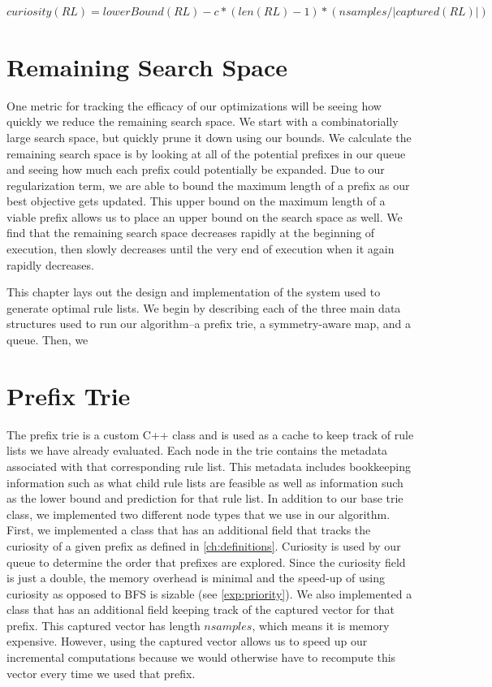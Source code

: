 \documentclass[]{report}
\theoremstyle{definition}
\begin{document}
\begin{math}
curiosity(RL) = lowerBound(RL) - c * (len(RL) - 1)  * (nsamples / |captured(RL)|)
\end{math}

\section{Remaining Search Space}
One metric for tracking the efficacy of our optimizations will be seeing how quickly we reduce the remaining search space.
We start with a combinatorially large search space, but quickly prune it down using our bounds.
We calculate the remaining search space is by looking at all of the potential prefixes in our  queue and seeing how much each prefix could potentially be expanded.
Due to our regularization term, we are able to bound the maximum length of a prefix as our best objective gets updated.
This upper bound on the maximum length of a viable prefix allows us to place an upper bound on the search space as well.
We find that the remaining search space decreases rapidly at the beginning of execution, then slowly decreases until the very end of execution when it again rapidly decreases.

This chapter lays out the design and implementation of the system used to generate optimal rule lists. 
We begin by describing each of the three main data structures used to run our algorithm--a prefix trie, a symmetry-aware map, and a queue. 
Then, we 

\section{Prefix Trie}
The prefix trie is a custom C++ class and is used as a cache to keep track of rule lists we have already evaluated. 
Each node in the trie contains the metadata associated with that corresponding rule list. 
This metadata includes bookkeeping information such as what child rule lists are feasible as well as information such as the lower bound and prediction for that rule list.
In addition to our base trie class, we implemented two different node types that we use in our algorithm.
First, we implemented a class that has an additional field that tracks the curiosity of a given prefix as defined in \ref{ch:definitions}.
Curiosity is used by our queue to determine the order that prefixes are explored.
Since the curiosity field is just a double, the memory overhead is minimal and the speed-up of using curiosity as opposed to BFS is sizable (see \ref{exp:priority}).
We also implemented a class that has an additional field keeping track of the captured vector for that prefix.
This captured vector has length $nsamples$, which means it is memory expensive.
However, using the captured vector allows us to speed up our incremental computations because we would otherwise have to recompute this vector every time we used that prefix.
\end{document}
